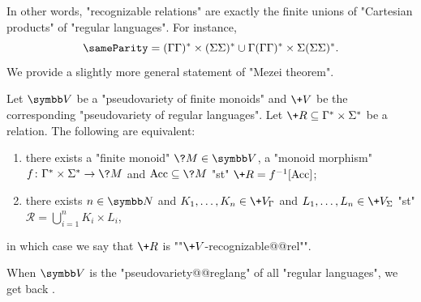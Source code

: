 In other words, "recognizable relations" are exactly the finite unions of
"Cartesian products" of "regular languages".
For instance, \[{\sameParity} =
(\Gamma\Gamma)^* \times (\Sigma\Sigma)^*
\cup \Gamma(\Gamma\Gamma)^* \times \Sigma(\Sigma\Sigma)^*.\]
We provide a slightly more general statement of "Mezei theorem".

\begin{proposition}
	\label{prop:Mezei-theorem-generalization}
	Let $\B{V}$ be a "pseudovariety of finite monoids"
	and $\+V$ be the corresponding "pseudovariety of regular languages".
	Let $\+R \subseteq \Gamma^* \times \Sigma^*$ be a relation.
	The following are equivalent:
	\begin{enumerate}
		\item there exists a "finite monoid" $\?M \in \B{V}$, a "monoid morphism"
		$f\colon \Gamma^* \times \Sigma^* \to \?M$ and $\Acc \subseteq \?M$
		"st" $\+R = f^{-1}[\Acc]$;
		\item there exists $n \in \N$
		and $K_1,\hdots,K_n \in \+V_{\Gamma}$ and $L_1,\hdots,L_n \in \+V_{\Sigma}$
		"st" $\mathcal{R} = \bigcup_{i=1}^n K_i \times L_i$,
	\end{enumerate}
	in which case we say that $\+R$ is \AP""$\+V$-recognizable@@rel"".
\end{proposition}

When $\B{V}$ is the "pseudovariety@@reglang" of all "regular languages",
we get back .

